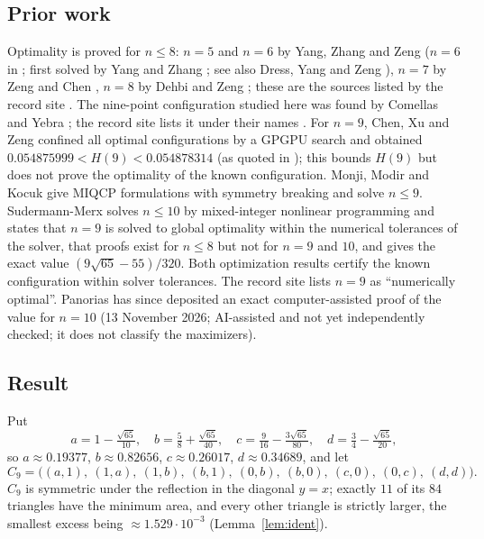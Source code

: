 \documentclass[11pt]{amsart}
\theoremstyle{definition}
\begin{document}
\subsection*{Prior work}
Optimality is proved for $n \le 8$: $n = 5$ and $n = 6$ by Yang, Zhang and Zeng \cite{YZZ,YZZ92} ($n = 6$ in \cite[Theorem~3]{YZZ92}; first solved by Yang and Zhang \cite{YZ80}; see also Dress, Yang and Zeng \cite{DYZ}), $n = 7$ by Zeng and Chen \cite{ZC}, $n = 8$ by Dehbi and Zeng \cite{DZ}; these are the sources listed by the record site \cite{Stead}. %
The nine-point configuration studied here was found by Comellas and Yebra \cite{CY}; the record site lists it under their names \cite{Stead}. %
For $n = 9$, Chen, Xu and Zeng \cite{Chen17} confined all optimal configurations by a GPGPU search and obtained $0.054875999 < H(9) < 0.054878314$ (as quoted in \cite{MMK}); this bounds $H(9)$ but does not prove the optimality of the known configuration. %
Monji, Modir and Kocuk \cite{MMK} give MIQCP formulations with symmetry breaking and solve $n \le 9$. %
Sudermann-Merx \cite{SM} solves $n \le 10$ by mixed-integer nonlinear programming and states that $n = 9$ is solved to global optimality within the numerical tolerances of the solver, that proofs exist for $n \le 8$ but not for $n = 9$ and $10$, and gives the exact value $(9\sqrt{65}-55)/320$. %
Both optimization results certify the known configuration within solver tolerances. The record site lists $n = 9$ as ``numerically optimal''. Panorias \cite{Pan10} has since deposited an exact computer-assisted proof of the value for $n = 10$ (13 November 2026; AI-assisted and not yet independently checked; it does not classify the maximizers). %

\subsection*{Result}
Put
\[
 a = 1 - \tfrac{\sqrt{65}}{10},\quad b = \tfrac58 + \tfrac{\sqrt{65}}{40},\quad c = \tfrac{9}{16} - \tfrac{3\sqrt{65}}{80},\quad d = \tfrac34 - \tfrac{\sqrt{65}}{20},
\]
so $a \approx 0.19377$, $b \approx 0.82656$, $c \approx 0.26017$, $d \approx 0.34689$, and let
\[
 C_9 = \bigl( (a,1),\ (1,a),\ (1,b),\ (b,1),\ (0,b),\ (b,0),\ (c,0),\ (0,c),\ (d,d) \bigr).
\]
$C_9$ is symmetric under the reflection in the diagonal $y = x$; exactly $11$ of its $84$ triangles have the minimum area, and every other triangle is strictly larger, the smallest excess being $\approx 1.529\cdot10^{-3}$ (Lemma~\ref{lem:ident}).
\end{document}
